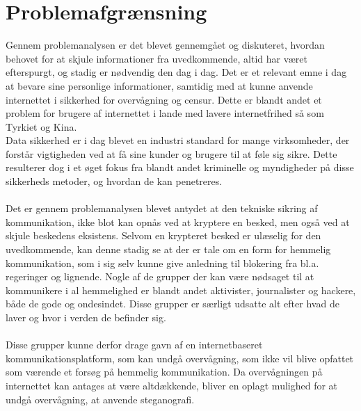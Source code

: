 \section{Problemafgrænsning}
Gennem problemanalysen er det blevet gennemgået og diskuteret, hvordan behovet for at skjule informationer fra uvedkommende, altid har været efterspurgt, og stadig er nødvendig den dag i dag. Det er et relevant emne i dag at bevare sine personlige informationer, samtidig med at kunne anvende internettet i sikkerhed for overvågning og censur. Dette er blandt andet et problem for brugere af internettet i lande med lavere internetfrihed så som Tyrkiet og Kina.\cite{FreedomHouseRapport2017}\\
\noindent
Data sikkerhed er i dag blevet en industri standard for mange virksomheder, der forstår vigtigheden ved at få sine kunder og brugere til at føle sig sikre. Dette resulterer dog i et øget fokus fra blandt andet kriminelle og myndigheder på disse sikkerheds metoder, og hvordan de kan penetreres.
\\\\
Det er gennem problemanalysen blevet antydet at den tekniske sikring af kommunikation, ikke blot kan opnås ved at kryptere en besked, men også ved at skjule beskedens eksistens. Selvom en krypteret besked er ulæselig for den uvedkommende, kan denne stadig se at der er tale om en form for hemmelig kommunikation, som i sig selv kunne give anledning til blokering fra bl.a. regeringer og lignende. Nogle af de grupper der kan være nødsaget til at kommunikere i al hemmelighed er blandt andet aktivister, journalister og hackere, både de gode og ondesindet. Disse grupper er særligt udsatte alt efter hvad de laver og hvor i verden de befinder sig.\cite{FreedomHouseRapport2017}
\\\\
Disse grupper kunne derfor drage gavn af en internetbaseret kommunikationsplatform, som kan undgå overvågning, som ikke vil blive opfattet som værende et forsøg på hemmelig kommunikation. 
Da overvågningen på internettet kan antages at være altdækkende, bliver en oplagt mulighed for at undgå overvågning, at anvende steganografi.